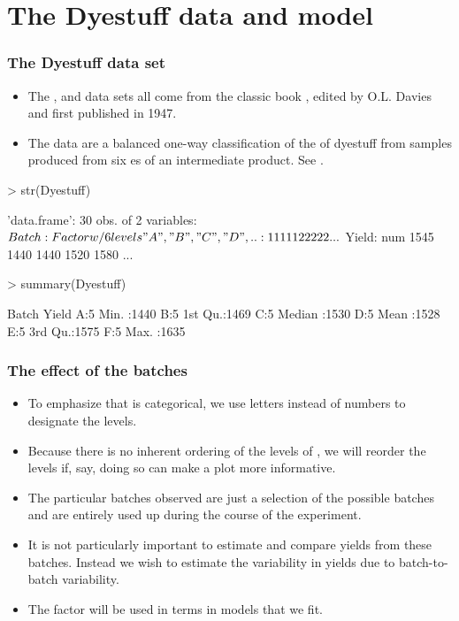 \section[Dyestuff]{The Dyestuff data and model}

\begin{frame}[fragile]
  \frametitle{The Dyestuff data set}
\begin{itemize}
\item The ,  and  data
  sets all come from the classic book , edited by O.L. Davies  and first published
  in 1947.
\item The  data are a balanced one-way classification
  of the  of dyestuff from samples produced from six
  es of an intermediate product. See .
\end{itemize}
\begin{Schunk}
\begin{Sinput}
> str(Dyestuff)
\end{Sinput}
\begin{Soutput}
'data.frame':	30 obs. of  2 variables:
 $ Batch: Factor w/ 6 levels "A","B","C","D",..: 1 1 1 1 1 2 2 2 2 2 ...
 $ Yield: num  1545 1440 1440 1520 1580 ...
\end{Soutput}
\begin{Sinput}
> summary(Dyestuff)
\end{Sinput}
\begin{Soutput}
 Batch     Yield     
 A:5   Min.   :1440  
 B:5   1st Qu.:1469  
 C:5   Median :1530  
 D:5   Mean   :1528  
 E:5   3rd Qu.:1575  
 F:5   Max.   :1635  
\end{Soutput}
\end{Schunk}
\end{frame}

\begin{frame}
  \frametitle{The effect of the batches}
  \begin{itemize}
  \item To emphasize that  is categorical, we use letters
    instead of numbers to designate the levels.
  \item Because there is no inherent ordering of the levels of
    , we will reorder the levels if, say, doing so can
    make a plot more informative.
  \item The particular batches observed are just a selection of the
    possible batches and are entirely used up during the course of
    the experiment.  
  \item It is not particularly important to estimate and compare
    yields from these batches.  Instead we wish to estimate the
    variability in yields due to batch-to-batch variability.
  \item The  factor will be used in 
    terms in models that we fit.
  \end{itemize}
\end{frame}

